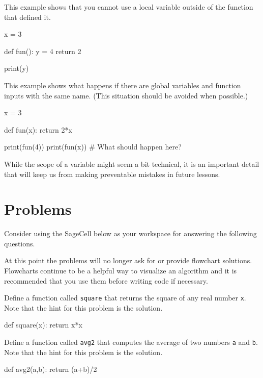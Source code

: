 \documentclass{ximera}
\begin{document}
This example shows that you cannot use a local variable outside of the function that defined it.

\begin{sageCell}
x = 3

def fun():
        y = 4
        return 2

print(y)
\end{sageCell}

This example shows what happens if there are global variables and function inputs with the same name. (This situation should be avoided when possible.)

\begin{sageCell}
x = 3

def fun(x):
	return 2*x

print(fun(4))
print(fun(x))     # What should happen here?
\end{sageCell}

While the scope of a variable might seem a bit technical, it is an important detail that will keep us from making preventable mistakes in future lessons.

\section{Problems}

Consider using the SageCell below as your workspace for answering the following questions. 

At this point the problems will no longer ask for or provide flowchart solutions. Flowcharts continue to be a helpful way to visualize an algorithm and it is recommended that you use them before writing code if necessary. 

\begin{question}
	Define a function called \verb|square| that returns the square of any real number \verb|x|. Note that the hint for this problem is the solution.
	\begin{hint}
\begin{sageCell}
def square(x):
        return x*x
\end{sageCell}
	\end{hint}
\end{question}

\begin{question}
	Define a function called \verb|avg2| that computes the average of two numbers \verb|a| and \verb|b|. Note that the hint for this problem is the solution.
	\begin{hint}
\begin{sageCell}
def avg2(a,b):
        return (a+b)/2
\end{sageCell}
	\end{hint}
\end{question}
\end{document}
